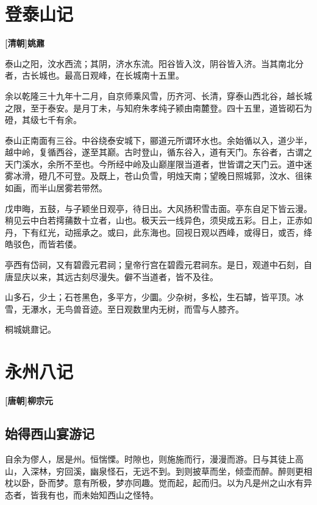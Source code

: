 \documentclass[UTF8,titlepage,oneside]{ctexbook}
\begin{document}
\chapter*{登泰山记}
\begin{center}
	\textbf{[清朝]姚鼐}
\end{center}

泰山之阳，汶水西流；其阴，济水东流。阳谷皆入汶，阴谷皆入济。当其南北分者，古长城也。最高日观峰，在长城南十五里。

余以乾隆三十九年十二月，自京师乘风雪，历齐河、长清，穿泰山西北谷，越长城之限，至于泰安。是月丁未，与知府朱孝纯子颍由南麓登。四十五里，道皆砌石为磴，其级七千有余。

泰山正南面有三谷。中谷绕泰安城下，郦道元所谓环水也。余始循以入，道少半，越中岭，复循西谷，遂至其巅。古时登山，循东谷入，道有天门。东谷者，古谓之天门溪水，余所不至也。今所经中岭及山巅崖限当道者，世皆谓之天门云。道中迷雾冰滑，磴几不可登。及既上，苍山负雪，明烛天南；望晚日照城郭，汶水、徂徕如画，而半山居雾若带然。

戊申晦，五鼓，与子颖坐日观亭，待日出。大风扬积雪击面。亭东自足下皆云漫。稍见云中白若摴蒱数十立者，山也。极天云一线异色，须臾成五彩。日上，正赤如丹，下有红光，动摇承之。或曰，此东海也。回视日观以西峰，或得日，或否，绛皓驳色，而皆若偻。

亭西有岱祠，又有碧霞元君祠；皇帝行宫在碧霞元君祠东。是日，观道中石刻，自唐显庆以来，其远古刻尽漫失。僻不当道者，皆不及往。

山多石，少土；石苍黑色，多平方，少圜。少杂树，多松，生石罅，皆平顶。冰雪，无瀑水，无鸟兽音迹。至日观数里内无树，而雪与人膝齐。

桐城姚鼐记。


\chapter*{永州八记}
\begin{center}
	\textbf{[唐朝]柳宗元}
\end{center}

\section*{始得西山宴游记}


自余为僇人，居是州。恒惴慄。时隙也，则施施而行，漫漫而游。日与其徒上高山，入深林，穷回溪，幽泉怪石，无远不到。到则披草而坐，倾壶而醉。醉则更相枕以卧，卧而梦。意有所极，梦亦同趣。觉而起，起而归。以为凡是州之山水有异态者，皆我有也，而未始知西山之怪特。
\end{document}
